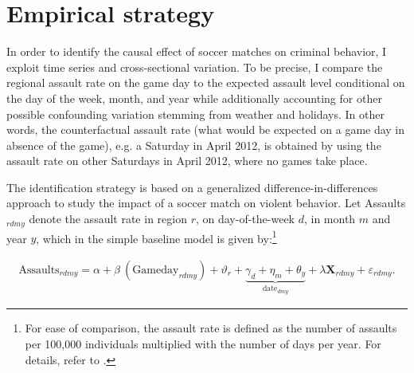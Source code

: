 \documentclass[11pt, a4paper]{article} %
\begin{document}
\newpage
\section{Empirical strategy}\label{sec_soc_ext:empirical_strategy}

In order to identify the causal effect of soccer matches on criminal behavior, I exploit time series and cross-sectional variation. To be precise, I compare the regional assault rate on the game day to the expected assault level conditional on the day of the week, month, and year while additionally accounting for other possible confounding variation stemming from weather and holidays. In other words, the counterfactual assault rate (what would be expected on a game day in absence of the game), e.g. a Saturday in April 2012, is obtained by using the assault rate on other Saturdays in April 2012, where no games take place. %


The identification strategy is based on a generalized difference-in-differences approach to study the impact of a soccer match on violent behavior. Let Assaults$_{rdmy}$ denote the assault rate in region $r$, on day-of-the-week $d$, in month $m$ and year $y$, which in the simple baseline model is given by:\footnote{For ease of comparison, the assault rate is defined as the number of assaults per 100,000 individuals multiplied with the number of days per year. For details, refer to \cite{hener2019noise}.}

\begin{align}
	\text{Assaults}_{rdmy} = \alpha + \beta\ (\text{Gameday}_{rdmy}) + \vartheta_r + \underbrace{\gamma_d + \eta_m + \theta_y}_{\text{date}_{dmy}} + \lambda \mathbf{X}_{rdmy} + \varepsilon_{rdmy}
	\label{eq_soc_ext:model}.
\end{align}
\end{document}
